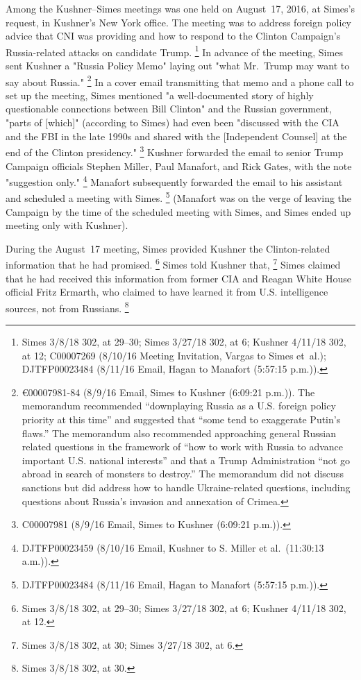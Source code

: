 Among the Kushner--Simes meetings was one held on August~17, 2016, at Simes's request, in Kushner's New York office.
The meeting was to address foreign policy advice that CNI was providing and how to respond to the Clinton Campaign's Russia-related attacks on candidate Trump.%
\footnote{Simes 3/8/18 302, at 29--30;
Simes 3/27/18 302, at 6;
Kushner 4/11/18 302, at 12;
C00007269 (8/10/16 Meeting Invitation, Vargas to Simes et~al.);
DJTFP00023484 (8/11/16 Email, Hagan to Manafort (5:57:15 p.m.)).}
In advance of the meeting, Simes sent Kushner a "Russia Policy Memo" laying out "what Mr.~Trump may want to say about Russia."%
\footnote{€00007981-84 (8/9/16 Email, Simes to Kushner (6:09:21 p.m.)).
The memorandum recommended “downplaying Russia as a U.S. foreign policy priority at this time” and suggested that “some tend to exaggerate Putin's flaws.”
The memorandum also recommended approaching general Russian related questions in the framework of “how to work with Russia to advance important U.S. national interests” and that a Trump Administration “not go abroad in search of monsters to destroy.”
The memorandum did not discuss sanctions but did address how to handle Ukraine-related questions, including questions about Russia's invasion and annexation of Crimea.}
In a cover email transmitting that memo and a phone call to set up the meeting, Simes mentioned "a well-documented story of highly questionable connections between Bill Clinton" and the Russian government, "parts of [which]" (according to Simes) had even been "discussed with the CIA and the FBI in the late 1990s and shared with the [Independent Counsel] at the end of the Clinton presidency."%
\footnote{C00007981 (8/9/16 Email, Simes to Kushner (6:09:21 p.m.)).}
Kushner forwarded the email to senior Trump Campaign officials Stephen Miller, Paul Manafort, and Rick Gates, with the note "suggestion only."%
\footnote{DJTFP00023459 (8/10/16 Email, Kushner to S. Miller et al.\ (11:30:13 a.m.)).}
Manafort subsequently forwarded the email to his assistant and scheduled a meeting with Simes.%
\footnote{DJTFP00023484 (8/11/16 Email, Hagan to Manafort (5:57:15 p.m.)).}
(Manafort was on the verge of leaving the Campaign by the time of the scheduled meeting with Simes, and Simes ended up meeting only with Kushner).

During the August~17 meeting, Simes provided Kushner the Clinton-related information that he had promised.%
\footnote{Simes 3/8/18 302, at 29--30;
Simes 3/27/18 302, at 6;
Kushner 4/11/18 302, at 12.}
Simes told Kushner that,
\footnote{Simes 3/8/18 302, at 30;
Simes 3/27/18 302, at 6.}
Simes claimed that he had received this information from former CIA and Reagan White House official Fritz Ermarth, who claimed to have learned it from U.S. intelligence sources, not from Russians.%
\footnote{Simes 3/8/18 302, at 30.}

